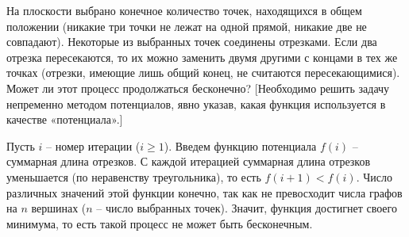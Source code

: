 \begin{task}{11}
На плоскости выбрано конечное количество точек, находящихся в общем положении (никакие три точки не лежат на одной прямой, никакие две не совпадают). Некоторые из выбранных точек соединены отрезками. Если два отрезка пересекаются, то их можно заменить двумя другими с концами в тех же точках (отрезки, имеющие лишь общий конец, не считаются пересекающимися). Может ли этот процесс продолжаться бесконечно? [Необходимо решить задачу непременно методом потенциалов, явно указав, какая функция используется в качестве «потенциала».]
\end{task}

\begin{solution}
Пусть $i$ -- номер итерации ($i \geq 1$). Введем функцию потенциала $f(i)$ -- суммарная длина отрезков. С каждой итерацией суммарная длина отрезков уменьшается (по неравенству треугольника), то есть $f(i+1)<f(i)$. Число различных значений этой функции конечно, так как не превосходит числа графов на $n$ вершинах ($n$ -- число выбранных точек). Значит, функция достигнет своего минимума, то есть такой процесс не может быть бесконечным.
\end{solution}